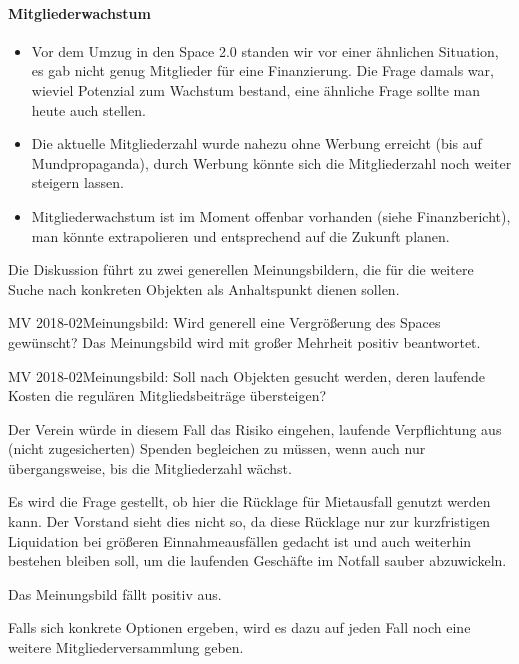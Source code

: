 \documentclass{s0minutes}
\begin{document}
\paragraph{Mitgliederwachstum}
\begin{itemize}
  \item Vor dem Umzug in den Space 2.0 standen wir vor einer ähnlichen
    Situation, es gab nicht genug Mitglieder für eine Finanzierung. Die Frage
    damals war, wieviel Potenzial zum Wachstum bestand, eine ähnliche Frage
    sollte man heute auch stellen.
  \item Die aktuelle Mitgliederzahl wurde nahezu ohne Werbung erreicht
    (bis auf Mundpropaganda), durch Werbung könnte sich die Mitgliederzahl noch
    weiter steigern lassen.
  \item Mitgliederwachstum ist im Moment offenbar vorhanden (siehe
    Finanzbericht), man könnte extrapolieren und entsprechend auf die Zukunft
    planen.
\end{itemize}

Die Diskussion führt zu zwei generellen Meinungsbildern, die für die weitere
Suche nach konkreten Objekten als Anhaltspunkt dienen sollen.

\begin{resolution}{MV 2018-02}{\consensus{\adopted}}{Meinungsbild: Wird
  generell eine Vergrößerung des Spaces gewünscht?}{}
  Das Meinungsbild wird mit großer Mehrheit positiv beantwortet.
\end{resolution}

\begin{resolution}{MV 2018-02}{\consensus{\adopted}}{Meinungsbild: Soll nach
  Objekten gesucht werden, deren laufende Kosten die regulären
  Mitgliedsbeiträge übersteigen?}{}

  Der Verein würde in diesem Fall das Risiko eingehen, laufende Verpflichtung
  aus (nicht zugesicherten) Spenden begleichen zu müssen, wenn auch nur
  übergangsweise, bis die Mitgliederzahl wächst.

  Es wird die Frage gestellt, ob hier die Rücklage für Mietausfall
  genutzt werden kann. Der Vorstand sieht dies nicht so, da diese Rücklage nur
  zur kurzfristigen Liquidation bei größeren Einnahmeausfällen gedacht ist und
  auch weiterhin bestehen bleiben soll, um die laufenden Geschäfte im Notfall
  sauber abzuwickeln.

  Das Meinungsbild fällt positiv aus.
\end{resolution}

Falls sich konkrete Optionen ergeben, wird es dazu auf jeden Fall noch eine
weitere Mitgliederversammlung geben.
\end{document}

